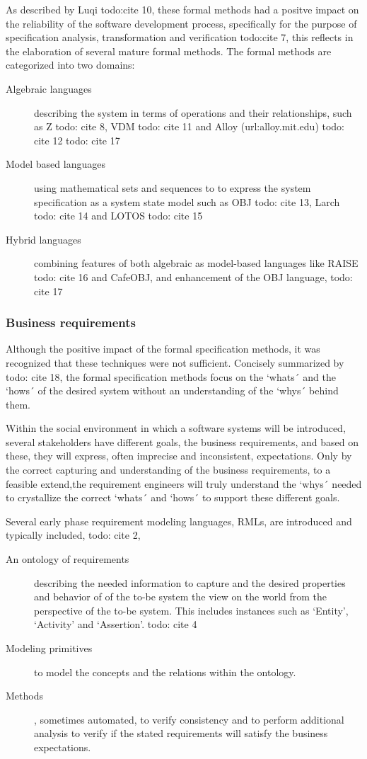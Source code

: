 As described by  Luqi todo:cite 10, these formal methods had a positve impact on the reliability of the software development process, specifically for the purpose of specification analysis, transformation and verification todo:cite 7, this  reflects  in the elaboration of several mature formal methods.
The formal methods are categorized into two domains:

\begin{description}
	\item[Algebraic languages] describing the system in terms of operations and their relationships, such as Z todo: cite 8, VDM todo: cite 11  and Alloy (url:alloy.mit.edu) todo: cite 12 todo: cite 17
	\item[Model based languages] using mathematical sets and sequences to to express the system specification as a system state model such as OBJ todo: cite 13, Larch todo: cite 14 and LOTOS todo: cite 15
	\item[Hybrid languages] combining features of both algebraic as model-based languages like RAISE todo: cite 16 and CafeOBJ, and enhancement of the OBJ language, todo: cite 17
\end{description}

\subsubsection{Business requirements}

Although the positive impact of the formal specification methods, it was recognized that these techniques were not sufficient. Concisely summarized by todo: cite 18, the formal specification methods focus on the `whats´ and the  `hows´ of the desired system without an understanding of the `whys´ behind them. 

Within the social environment in which a software systems will be introduced, several stakeholders have different goals, the business requirements, and based on these, they will express, often imprecise and inconsistent, expectations. Only by the correct capturing and understanding of the business requirements, to a feasible extend,the requirement engineers will truly understand the `whys´ needed to crystallize the correct  `whats´ and  `hows´ to support these different goals.

Several early phase requirement modeling languages, RMLs, are introduced and typically included, todo: cite 2, 
\begin{description}
	\item[An ontology of requirements] describing the needed information to capture and the desired properties and behavior of of the to-be system the view on the world from the perspective of the to-be system. This includes instances such as `Entity', `Activity' and `Assertion'. todo: cite 4
	\item[Modeling primitives] to model the concepts and the relations within the ontology.
	\item[Methods], sometimes automated, to verify consistency and to perform additional analysis to verify if the stated requirements will satisfy the business expectations.
\end{description}

